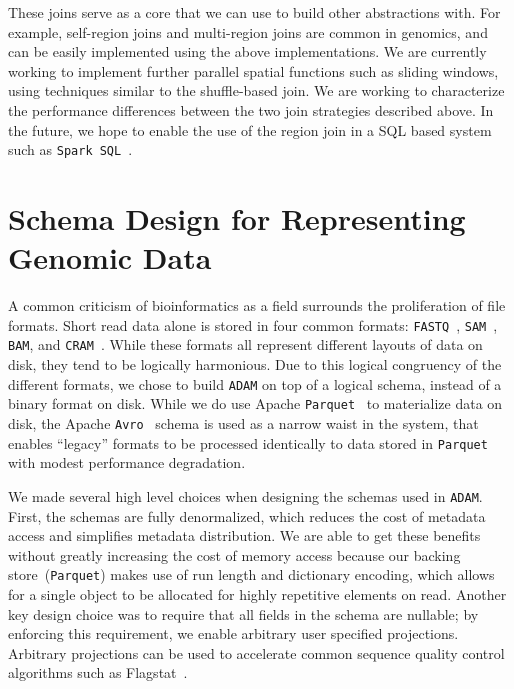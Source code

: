 \documentclass[phd]{ucbthesis}
\begin{document}
These joins serve as a core that we can use to build other abstractions with. For example, self-region joins and
multi-region joins are common in genomics, and can be easily implemented using the above implementations.
We are currently working to implement further parallel spatial functions such as sliding windows, using techniques
similar to the shuffle-based join. We are working to characterize the performance differences between the two
join strategies described above. In the future, we hope to enable the use of the region join in a SQL based system
such as \texttt{Spark SQL}~\cite{armbrust15}.

\section{Schema Design for Representing Genomic Data}
\label{sec:schema-design}

A common criticism of bioinformatics as a field surrounds the proliferation of file formats. Short read data alone is
stored in four common formats: \texttt{FASTQ}~\cite{cock10}, \texttt{SAM}~\cite{li09}, \texttt{BAM}, and
\texttt{CRAM}~\cite{fritz11}. While these formats all represent different layouts of data on disk, they tend to be
logically harmonious. Due to this logical congruency of the different formats, we chose to build \texttt{ADAM}
on top of a logical schema, instead of a binary format on disk. While we do use Apache \texttt{Parquet}~\cite{parquet} to
materialize data on disk, the Apache \texttt{Avro}~\cite{avro} schema is used as a narrow waist in the system,
that enables ``legacy'' formats to be processed identically to data stored in \texttt{Parquet} with modest performance
degradation.

We made several high level choices when designing the schemas used in \texttt{ADAM}. First, the schemas are fully
denormalized, which reduces the cost of metadata access and simplifies metadata distribution. We are able to
get these benefits without greatly increasing the cost of memory access because our backing store~(\texttt{Parquet})
makes use of run length and dictionary encoding, which allows for a single object to be allocated for highly repetitive
elements on read. Another key design choice was to require that all fields in the schema are nullable; by enforcing
this requirement, we enable arbitrary user specified projections. Arbitrary projections can be used to accelerate
common sequence quality control algorithms such as Flagstat~\cite{massie13, nothaft15}.
\end{document}
